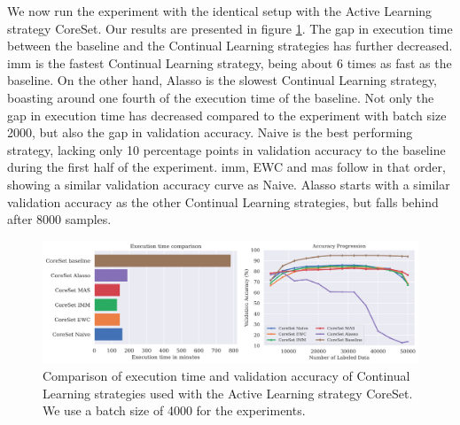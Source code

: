 We now run the experiment with the identical setup with the Active Learning strategy CoreSet. Our results are presented in figure \ref{fig:Evaluation:Results:CAL:CoreSet4000}. The gap in execution time between the baseline and the Continual Learning 
strategies has further decreased. \gls{imm} is the fastest Continual Learning strategy, being about 6 times as fast as the baseline. On the other hand, Alasso is the slowest Continual Learning strategy, boasting around one fourth of the execution time of the
baseline. Not only the gap in execution time has decreased compared to the experiment with batch size 2000, but also the gap in validation accuracy. Naive is the best performing strategy, lacking only 10 percentage points in validation accuracy to the
baseline during the first half of the experiment. \gls{imm}, EWC and \gls{mas} follow in that order, showing a similar validation accuracy curve as Naive. Alasso starts with a similar validation accuracy as the other Continual Learning strategies, but falls behind
after 8000 samples. \par


\begin{figure}[h]
    \centering
    \includegraphics[width=\linewidth]{images/results_CAL/CoreSet_CAL_4000b.png}
    \caption[Continual Active Learning CoreSet 4000 batch size]{Comparison of execution time and validation accuracy of Continual Learning strategies used with the Active Learning strategy
    CoreSet. We use a batch size of 4000 for the experiments.}
    \label{fig:Evaluation:Results:CAL:CoreSet4000}
\end{figure}

